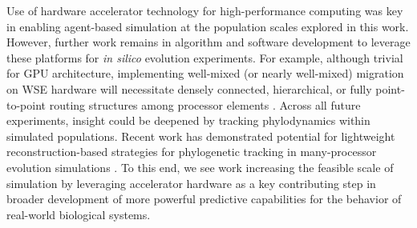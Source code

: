 Use of hardware accelerator technology for high-performance computing was key in enabling agent-based simulation at the population scales explored in this work.
However, further work remains in algorithm and software development to leverage these platforms for \textit{in silico} evolution experiments.
For example, although trivial for GPU architecture, implementing well-mixed (or nearly well-mixed) migration on WSE hardware will necessitate densely connected, hierarchical, or fully point-to-point routing structures among processor elements \citep{james2020physical,luczynski2024near}.
Across all future experiments, insight could be deepened by tracking phylodynamics within simulated populations.
Recent work has demonstrated potential for lightweight reconstruction-based strategies for phylogenetic tracking in many-processor evolution simulations \citep{moreno2024trackable}.
To this end, we see work increasing the feasible scale of simulation by leveraging accelerator hardware as a key contributing step in broader development of more powerful predictive capabilities for the behavior of real-world biological systems.
